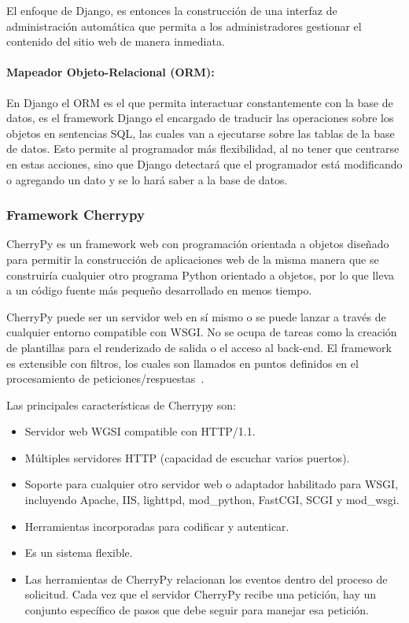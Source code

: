 \documentclass[journal,transmag]{IEEEtran}
\begin{document}
El enfoque de Django, es entonces la construcción de una interfaz de administración automática que permita a los administradores gestionar el contenido del sitio web de manera inmediata.

\paragraph{Mapeador Objeto-Relacional (ORM):} 

En Django el ORM es el que permita interactuar constantemente con la base de datos, es el framework Django el encargado de traducir las operaciones sobre los objetos en sentencias SQL, las cuales van a ejecutarse sobre las tablas de la base de datos. Esto permite al programador más flexibilidad, al no tener que centrarse en estas acciones, sino que Django detectará que el programador está modificando o agregando un dato y se lo hará saber a la base de datos.

\subsubsection{Framework Cherrypy}\label{sub:cherrypy}
CherryPy es un framework web con programación orientada a objetos diseñado para permitir la construcción de aplicaciones web de la misma manera que se construiría cualquier otro programa Python orientado a objetos, por lo que lleva a un código fuente más pequeño desarrollado en menos tiempo.

CherryPy puede ser un servidor web en sí mismo o se puede lanzar a través de cualquier entorno compatible con WSGI. No se ocupa de tareas como la creación de plantillas para el renderizado de salida o el acceso al back-end. El framework es extensible con filtros, los cuales son llamados en puntos definidos en el procesamiento de peticiones/respuestas~\cite{Cherrypy}.

Las principales características de Cherrypy son:

\begin{itemize}
	\item Servidor web WGSI compatible con HTTP/1.1.
	\item Múltiples servidores HTTP (capacidad de escuchar varios puertos).
	\item Soporte para cualquier otro servidor web o adaptador habilitado para WSGI, incluyendo Apache, 	IIS, lighttpd, mod\_python, FastCGI, SCGI y mod\_wsgi.
	\item Herramientas incorporadas para codificar y autenticar.
	\item Es un sistema flexible.
	\item Las herramientas de CherryPy relacionan los eventos dentro del proceso de solicitud. Cada vez que el servidor CherryPy recibe una petición, hay un conjunto específico de pasos que debe seguir para manejar esa petición.
\end{itemize}
\end{document}

